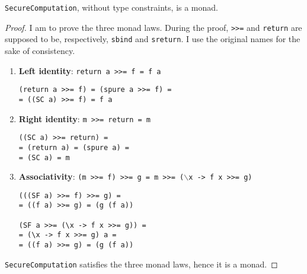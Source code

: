 \begin{proposition}
\texttt{SecureComputation}, without type constraints, is a monad.
\end{proposition}
\begin{proof}
I am to prove the three monad laws. During the proof, \texttt{>>=} and \texttt{return} are supposed to be, respectively, \texttt{sbind} and \texttt{sreturn}. I use the original names for the sake of consistency.
\begin{enumerate}
	\item \textbf{Left identity}: \texttt{return a >>= f = f a}
		\begin{lstlisting}
(return a >>= f) = (spure a >>= f) = 
= ((SC a) >>= f) = f a
		\end{lstlisting}
	
	\item \textbf{Right identity}: \texttt{m >>= return = m}
		\begin{lstlisting}
((SC a) >>= return) = 
= (return a) = (spure a) = 
= (SC a) = m
		\end{lstlisting}
	\item \textbf{Associativity}: \texttt{(m >>= f) >>= g = m >>= ($\backslash$x -> f x >>= g)} 
		\begin{lstlisting}
(((SF a) >>= f) >>= g) = 
= ((f a) >>= g) = (g (f a))

(SF a >>= (\x -> f x >>= g)) =
= (\x -> f x >>= g) a = 
= ((f a) >>= g) = (g (f a))
		\end{lstlisting}
\end{enumerate}
\texttt{SecureComputation} satisfies the three monad laws, hence it is a monad.
\end{proof}